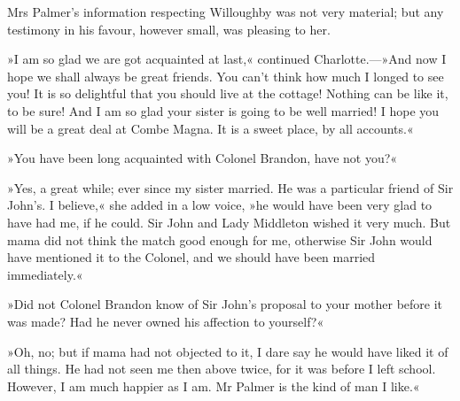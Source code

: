 Mrs Palmer’s information respecting Willoughby was not very material; but any testimony in his favour, however small, was pleasing to her.

»I am so glad we are got acquainted at last,« continued Charlotte.—»And now I hope we shall always be great friends. You can’t think how much I longed to see you! It is so delightful that you should live at the cottage! Nothing can be like it, to be sure! And I am so glad your sister is going to be well married! I hope you will be a great deal at Combe Magna. It is a sweet place, by all accounts.«

»You have been long acquainted with Colonel Brandon, have not you?«

»Yes, a great while; ever since my sister married. He was a particular friend of Sir John’s. I believe,« she added in a low voice, »he would have been very glad to have had me, if he could. Sir John and Lady Middleton wished it very much. But mama did not think the match good enough for me, otherwise Sir John would have mentioned it to the Colonel, and we should have been married immediately.«

»Did not Colonel Brandon know of Sir John’s proposal to your mother before it was made? Had he never owned his affection to yourself?«

»Oh, no; but if mama had not objected to it, I dare say he would have liked it of all things. He had not seen me then above twice, for it was before I left school. However, I am much happier as I am. Mr Palmer is the kind of man I like.«

\makeatletter
{}
{%

}{%
  \enlargethispage{\baselineskip}
}
\makeatother